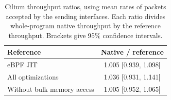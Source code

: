 \begin{table}[ht]
\centering
\small
\caption{Cilium throughput ratios, using mean rates of packets accepted by the sending interfaces. Each ratio divides whole-program native throughput by the reference throughput. Brackets give 95\% confidence intervals.}
\label{tab:eval-native-comparison}
\setlength{\tabcolsep}{3pt}
\renewcommand{\arraystretch}{1.08}
\begin{tabular}{@{}lc@{}}
\toprule
\textbf{Reference} & \textbf{Native / reference} \\
\midrule
eBPF JIT & 1.005 [0.939, 1.098] \\
All optimizations & 1.036 [0.931, 1.141] \\
Without bulk memory access & 1.005 [0.952, 1.065] \\
\bottomrule
\end{tabular}
\end{table}
